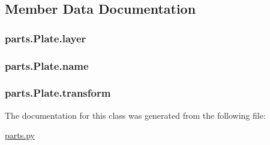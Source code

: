 \subsection{Member Data Documentation}
\hypertarget{classparts_1_1_plate_a2f319734232a2fc2a61e4fc3c23e973a}{}
\subsubsection[{layer}]{\setlength{\rightskip}{0pt plus 5cm}parts.\+Plate.\+layer}\label{classparts_1_1_plate_a2f319734232a2fc2a61e4fc3c23e973a}
\hypertarget{classparts_1_1_plate_a23ed4bbfbfe13a065a06ba86521525a2}{}
\subsubsection[{name}]{\setlength{\rightskip}{0pt plus 5cm}parts.\+Plate.\+name}\label{classparts_1_1_plate_a23ed4bbfbfe13a065a06ba86521525a2}
\hypertarget{classparts_1_1_plate_a7a97307757824cf574eb989e06b0eeb4}{}
\subsubsection[{transform}]{\setlength{\rightskip}{0pt plus 5cm}parts.\+Plate.\+transform}\label{classparts_1_1_plate_a7a97307757824cf574eb989e06b0eeb4}


The documentation for this class was generated from the following file\+:\begin{DoxyCompactItemize}
\item 
\hyperlink{parts_8py}{parts.\+py}\end{DoxyCompactItemize}
